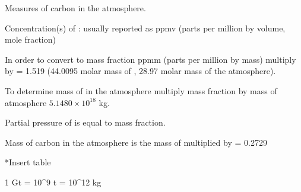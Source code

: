 Measures of carbon in the atmosphere.

Concentration(s) of :
usually reported as ppmv (parts per million by volume, mole fraction)

In order to convert to mass fraction ppmm (parts per million by mass) multiply by  = 1.519 (44.0095 molar mass of , 28.97 molar mass of the atmosphere).

To determine mass of  in the atmosphere multiply mass fraction by mass of atmosphere $5.1480 \times 10^18$ kg.

Partial pressure of  is equal to mass fraction.

Mass of carbon in the atmosphere is the mass of  multiplied by  = 0.2729

*Insert table

1 Gt = 10^9 t = 10^12 kg
